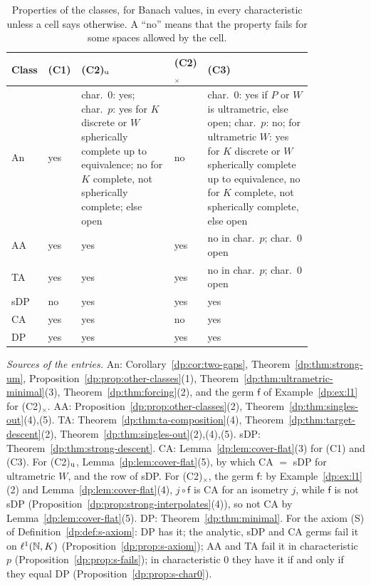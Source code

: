 \begin{table}[htbp]
\small
\caption{Properties of the classes, for Banach values, in every characteristic unless a cell says otherwise. A ``no'' means that the property fails for some spaces allowed by the cell.}\label{dp:s:tab:descents}
\begin{tabular}{@{}p{0.07\linewidth}p{0.06\linewidth}p{0.3\linewidth}p{0.07\linewidth}p{0.34\linewidth}@{}}
Class & (C1) & (C2)$_{\rm u}$ & (C2)$_\times$ & (C3)\\
\hline
An & yes & char.\ $0$: yes; char.\ $p$: yes for $K$ discrete or $W$ spherically complete up to equivalence; no for $K$ complete, not spherically complete; else open & no & char.\ $0$: yes if $P$ or $W$ is ultrametric, else open; char.\ $p$: no; for ultrametric $W$: yes for $K$ discrete or $W$ spherically complete up to equivalence, no for $K$ complete, not spherically complete, else open\\
AA & yes & yes & yes & no in char.\ $p$; char.\ $0$ open\\
TA & yes & yes & yes & no in char.\ $p$; char.\ $0$ open\\
sDP & no & yes & yes & yes\\
CA & yes & yes & no & yes\\
DP & yes & yes & yes & yes\\
\end{tabular}
\end{table}

\emph{Sources of the entries.} An: Corollary~\ref{dp:cor:two-gaps}, Theorem~\ref{dp:thm:strong-um}, Proposition~\ref{dp:prop:other-classes}(1), Theorem~\ref{dp:thm:ultrametric-minimal}(3), Theorem~\ref{dp:thm:forcing}(2), and the germ $\mathsf f$ of Example~\ref{dp:ex:l1} for (C2)$_\times$. AA: Proposition~\ref{dp:prop:other-classes}(2), Theorem~\ref{dp:thm:singles-out}(4),(5). TA: Theorem~\ref{dp:thm:ta-composition}(4), Theorem~\ref{dp:thm:target-descent}(2), Theorem~\ref{dp:thm:singles-out}(2),(4),(5). sDP: Theorem~\ref{dp:thm:strong-descent}. CA: Lemma~\ref{dp:lem:cover-flat}(3) for (C1) and (C3). For (C2)$_{\rm u}$, Lemma~\ref{dp:lem:cover-flat}(5), by which CA $=$ sDP for ultrametric $W$, and the row of sDP. For (C2)$_\times$, the germ $\mathsf f$: by Example~\ref{dp:ex:l1}(2) and Lemma~\ref{dp:lem:cover-flat}(4), $j\circ\mathsf f$ is CA for an isometry $j$, while $\mathsf f$ is not sDP (Proposition~\ref{dp:prop:strong-interpolates}(4)), so not CA by Lemma~\ref{dp:lem:cover-flat}(5). DP: Theorem~\ref{dp:thm:minimal}. For the axiom (S) of Definition~\ref{dp:def:s-axiom}: DP has it; the analytic, sDP and CA germs fail it on $\ell^1(\mathbb N,K)$ (Proposition~\ref{dp:prop:s-axiom}); AA and TA fail it in characteristic $p$ (Proposition~\ref{dp:prop:s-fails}); in characteristic $0$ they have it if and only if they equal DP (Proposition~\ref{dp:prop:s-char0}).

